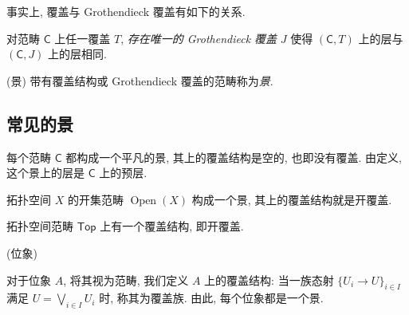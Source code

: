 事实上, 覆盖与 Grothendieck 覆盖有如下的关系.

\begin{prop}
	{}
	对范畴 $\mathsf C$ 上任一覆盖 $T$, \emph{存在唯一的 Grothendieck 覆盖} $J$ 使得 $(\mathsf C,T)$ 上的层与 $(\mathsf C,J)$ 上的层相同.
\end{prop}

\begin{definition}
	{(景)}
	带有覆盖结构或 Grothendieck 覆盖的范畴称为\emph{景}.
\end{definition}

\subsection{常见的景}


\begin{example}
    {}
    每个范畴 $\mathsf C$ 都构成一个平凡的景, 其上的覆盖结构是空的,
    也即没有覆盖. 由定义, 这个景上的层是 $\mathsf C$ 上的预层.
\end{example}

\begin{example}
    [label={topological-space-as-site}]
    {}
    拓扑空间 $X$ 的开集范畴 $\operatorname{Open}(X)$ 构成一个景, 其上的覆盖结构就是开覆盖.
\end{example}


\begin{example}
    {}
    拓扑空间范畴 $\mathsf {Top}$ 上有一个覆盖结构, 即开覆盖. %
\end{example}

\begin{example}
	[label={locale-as-site}]
    {(位象)}
    
    对于位象 $A$, 将其视为范畴, 我们定义 $A$ 上的覆盖结构:
    当一族态射 $\{U_i \to U\}_{i\in I}$ 满足 $U = \bigvee_{i\in I} U_i$ 时, 称其为覆盖族.
    由此, 每个位象都是一个景.
\end{example}

